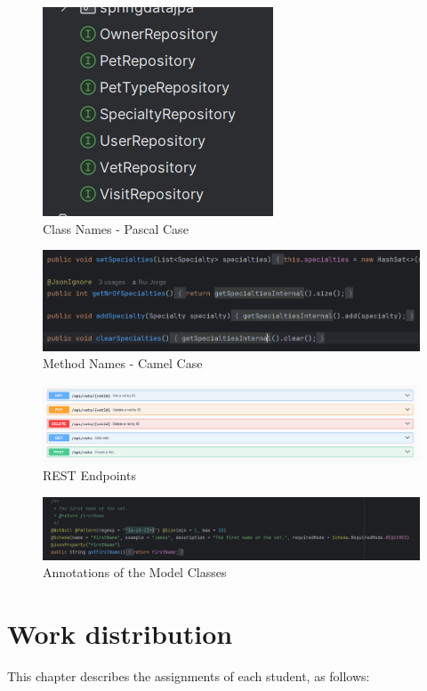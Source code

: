 \documentclass[a4paper,11pt,openright,BCOR=15mm]{scrbook}
\begin{document}
		\begin{figure}[h!]
			\centering
			\includegraphics[width=0.5\linewidth]{figs/pascalCase.png}
			\caption{Class Names - Pascal Case}
			\label{pascalcase}
		\end{figure}

		\begin{figure}[h!]
			\centering
			\includegraphics[width=0.5\linewidth]{figs/camelCase.png}
			\caption{Method Names - Camel Case}
			\label{camelcase}
		\end{figure}

		\begin{figure}[h!]
			\centering
			\includegraphics[width=0.5\linewidth]{figs/restConvention.png}
			\caption{REST Endpoints}
			\label{restConvention}
		\end{figure}
	
		\begin{figure}[h!]
			\centering
			\includegraphics[width=0.5\linewidth]{figs/annotationConvention.png}
			\caption{Annotations of the Model Classes}
			\label{annotationConvention}
		\end{figure}

	
	
	\chapter{Work distribution}
	This chapter describes the assignments of each student, as follows:\newline
		
\end{document}
